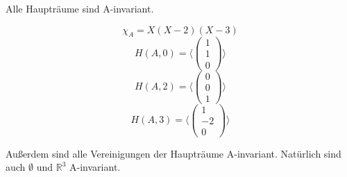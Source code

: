 \documentclass[10pt,a4paper]{article}
\begin{document}
Alle Haupträume sind A-invariant.

\begin{equation}
\chi_{A} = X(X-2)(X-3)
\end{equation}
\begin{equation}
H(A,0) = \langle
\begin{pmatrix}
1\\1\\0
\end{pmatrix}
\rangle
\end{equation}
\begin{equation}
H(A,2) = \langle
\begin{pmatrix}
0\\0\\1
\end{pmatrix}
\rangle
\end{equation}
\begin{equation}
H(A,3) = \langle
\begin{pmatrix}
1\\-2\\0
\end{pmatrix}
\rangle
\end{equation}

Außerdem sind alle Vereinigungen der Haupträume A-invariant.
Natürlich sind auch $\emptyset$ und $\mathbb{R}^{3}$ A-invariant.
\end{document}
